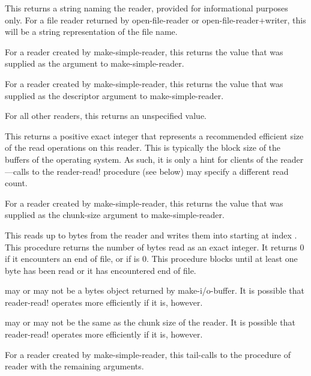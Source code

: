 \begin{entry}{%
}
   
This returns a string naming the reader, provided for informational
purposes only. For a file reader returned by {\cf open-file-reader} or
{\cf open-file-reader+writer}, this will be a string representation of the file
name.
  
For a reader created by {\cf make-simple-reader}, this returns the value that was
supplied as the  argument to {\cf make-simple-reader}.
\end{entry}

\begin{entry}{%
}
   
For a reader created by {\cf make-simple-reader}, this returns the value that was
supplied as the descriptor argument to {\cf make-simple-reader}.
   
For all other readers, this returns an unspecified value.
\end{entry}

\begin{entry}{%
}
   
This returns a positive exact integer that represents a recommended
efficient size of the read operations on this reader. This is typically the
block size of the buffers of the operating system. As such, it is only a
hint for clients of the reader---calls to the {\cf reader-read!} procedure (see
below) may specify a different read count.

For a reader created by {\cf make-simple-reader}, this returns the
value that was supplied as the chunk-size argument to {\cf
  make-simple-reader}.
\end{entry}

\begin{entry}{%
}
   
This reads up to  bytes from the reader and writes them into
 starting at index
.  This procedure returns the number of bytes read
as an exact integer. It returns 0 if it encounters an end of file, or
if  is 0.  This procedure blocks until at least one byte has been
read or it has encountered end of file.
   
 may or may not be a bytes object returned by {\cf
  make-i/o-buffer}. It is possible that {\cf reader-read!} operates
more efficiently if it is, however.
   
 may or may not be the same as the chunk size of the
reader. It is possible that {\cf reader-read!} operates more
efficiently if it is, however.
   
For a reader created by {\cf make-simple-reader}, this tail-calls to
the  procedure of reader with the remaining arguments.
\end{entry}

